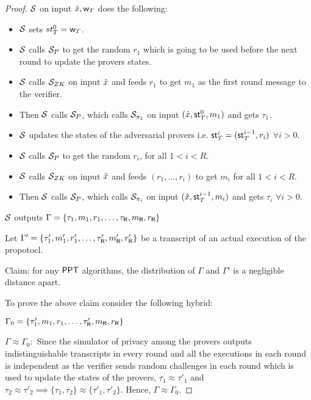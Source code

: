 \begin{proof}
	$\mathcal{S}$ on input $\hat{x}, \mathsf{w}_T$ does the following: 
	\begin{itemize}
		\item $\mathcal{S}$ sets $st^0_T = \mathsf{w}_T$.
		\item $\mathcal{S}$ calls $\mathcal{S}_P$ to get the random $r_1$ which is going to be used before the next round to update the provers states.
		\item $\mathcal{S}$ calls $\mathcal{S}_{ZK}$ on input $\hat{x}$ and feeds $r_1$ to get $m_{1}$ as the first round message to the verifier.
		\item Then $\mathcal{S}$ calls $\mathcal{S}_{P}$, which calls $\mathcal{S}_{\pi_1}$ on input $(\hat{x}, \mathsf{st}^0_T , m_{1})$ and gets $\tau_{1}$.
		\item $\mathcal{S}$ updates the states of the adversarial provers i.e. $\mathsf{st}^i_T = (\mathsf{st}^{i-1}_T, r_i)$ $\forall i>0$.
		\item $\mathcal{S}$ calls $\mathcal{S}_P$ to get the random $r_i$, for all $1<i <R$.
		\item $\mathcal{S}$ calls $\mathcal{S}_{ZK}$ on input $\hat{x}$ and feeds $(r_1, \ldots, r_i)$ to get $m_i$ for all $1<i<R$.
		\item Then $\mathcal{S}$ calls $\mathcal{S}_{P}$, which calls $\mathcal{S}_{\pi_{i}}$ on input $(\hat{x}, \mathsf{st}^{i-1}_T , m_{i})$ and gets $\tau_{i}$ $\forall i>0$. 
	\end{itemize}
	$\mathcal{S}$ outputs $\Gamma = \{\tau_1, m_1 ,r_1, \ldots, \tau_{\mathsf{R}}, m_{\mathsf{R}}, r_{\mathsf{R}} \}$ 
	
	Let $\Gamma' = \{\tau'_1, m'_1 ,r'_1, \ldots, \tau'_{\mathsf{R}}, m'_{\mathsf{R}}, r'_{\mathsf{R}} \}$ be a transcript of an actual execution of the propotocl.
	
	Claim: for any $\mathsf{PPT}$ algorithms, the distribution of $\Gamma$ and $\Gamma'$ is a negligible distance apart.
	
	
	To prove the above claim consider the following hybrid: 
	
	$\Gamma_0 = \{\tau'_1, m_1 ,r_1, \ldots, \tau'_{\mathsf{R}}, m_{\mathsf{R}}, r_{\mathsf{R}} \}$
	
	$\Gamma \approx \Gamma_0 : $ Since the simulator of privacy among the provers outputs indistinguishable transcripts in every round and all the executions in each round is independent as the verifier sends random challenges in each round which is used to update the states of the provers, $\tau_1 \approx \tau'_1$ and $\tau_2 \approx \tau'_2 \implies \{\tau_1, \tau_2\} \approx \{\tau'_1, \tau'_2\}$. Hence, $\Gamma \approx \Gamma_0$.
	

\end{proof}
